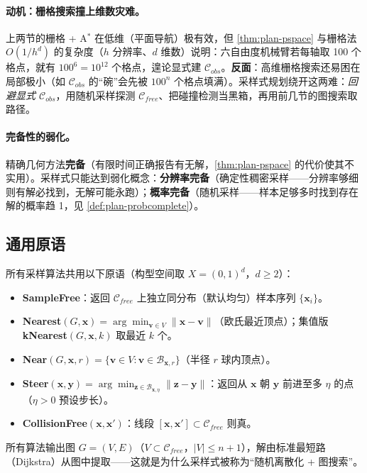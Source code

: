 \paragraph{动机：栅格搜索撞上维数灾难。}
上两节的栅格 + A$^*$ 在低维（平面导航）极有效，但 \cref{thm:plan-pspace} 与栅格法 $O(1/h^d)$ 的复杂度（$h$ 分辨率、$d$ 维数）说明：六自由度机械臂若每轴取 100 个格点，就有 $100^6=10^{12}$ 个格点，遑论显式建 $\mathcal{C}_{obs}$。\textbf{反面}：高维栅格搜索还易困在局部极小（如 $\mathcal{C}_{obs}$ 的“碗”会先被 $100^n$ 个格点填满）。采样式规划绕开这两难：\emph{回避显式 $\mathcal{C}_{obs}$}，用随机采样探测 $\mathcal{C}_{free}$、把碰撞检测当黑箱，再用前几节的图搜索取路径。

\paragraph{完备性的弱化。}
精确几何方法\textbf{完备}（有限时间正确报告有无解，\cref{thm:plan-pspace} 的代价使其不实用）。采样式只能达到弱化概念：\textbf{分辨率完备}（确定性稠密采样——分辨率够细则有解必找到，无解可能永跑）；\textbf{概率完备}（随机采样——样本足够多时找到存在解的概率趋 1，见 \cref{def:plan-probcomplete}）。

\subsection{通用原语}
\label{sec:plan-primitives}

所有采样算法共用以下原语\cite{karaman2011sampling}（构型空间取 $X=(0,1)^d$，$d\ge2$）：
\begin{itemize}
  \item \textbf{SampleFree}：返回 $\mathcal{C}_{free}$ 上独立同分布（默认均匀）样本序列 $\{\mathbf{x}_i\}$。
  \item \textbf{Nearest}$(G,\mathbf{x})=\arg\min_{\mathbf{v}\in V}\|\mathbf{x}-\mathbf{v}\|$（欧氏最近顶点）；集值版 \textbf{kNearest}$(G,\mathbf{x},k)$ 取最近 $k$ 个。
  \item \textbf{Near}$(G,\mathbf{x},r)=\{\mathbf{v}\in V:\mathbf{v}\in\mathcal{B}_{\mathbf{x},r}\}$（半径 $r$ 球内顶点）。
  \item \textbf{Steer}$(\mathbf{x},\mathbf{y})=\arg\min_{\mathbf{z}\in\mathcal{B}_{\mathbf{x},\eta}}\|\mathbf{z}-\mathbf{y}\|$：返回从 $\mathbf{x}$ 朝 $\mathbf{y}$ 前进至多 $\eta$ 的点（$\eta>0$ 预设步长）。
  \item \textbf{CollisionFree}$(\mathbf{x},\mathbf{x}')$：线段 $[\mathbf{x},\mathbf{x}']\subset\mathcal{C}_{free}$ 则真。
\end{itemize}
所有算法输出图 $G=(V,E)$（$V\subset\mathcal{C}_{free}$，$|V|\le n+1$），解由标准最短路（Dijkstra）从图中提取——这就是为什么采样式被称为“随机离散化 + 图搜索”。


